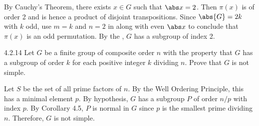 \begin{sol}
	By Cauchy's Theorem, there exists $x \in G$ such that $\abs x = 2$.
	Then $\pi(x)$ is of order 2 and is hence a product of disjoint transpositions.
	Since $\abs{G} = 2k$ with $k$ odd, use $m = k$ and $n = 2$ in  along with even $\abs x$ to conclude that $\pi(x)$ is an odd permutation.
	By the , $G$ has a subgroup of index 2.
\end{sol}

\begin{exercise}{4.2.14}
	Let $G$ be a finite group of composite order $n$ with the property that $G$ has a subgroup of order $k$ for each positive integer $k$ dividing $n$.
	Prove that $G$ is not simple.
\end{exercise}

\begin{sol}
	Let $S$ be the set of all prime factors of $n$.
	By the Well Ordering Principle, this has a minimal element $p$.
	By hypothesis, $G$ has a subgroup $P$ of order $n/p$ with index $p$.
	By Corollary 4.5, $P$ is normal in $G$ since $p$ is the smallest prime dividing $n$.
	Therefore, $G$ is not simple.
\end{sol}
